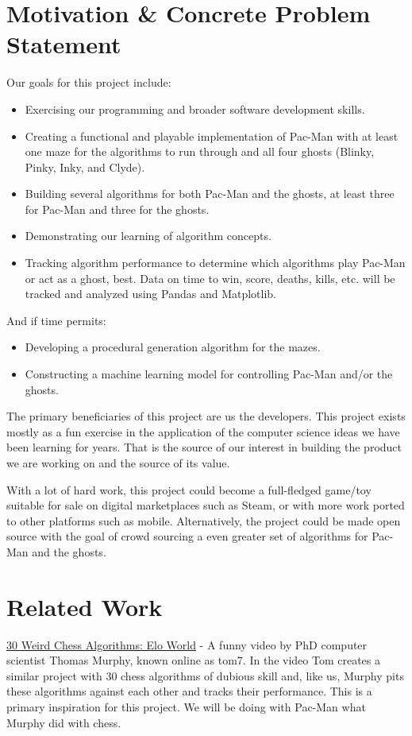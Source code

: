 \documentclass[12pt]{article}
\begin{document}
    \section{Motivation \& Concrete Problem Statement}
        Our goals for this project include:
        \begin{itemize}
            \itemsep-4pt
            \item Exercising our programming and broader software development skills.
            \item Creating a functional and playable implementation of Pac-Man with at least one maze for the algorithms to run through and all four ghosts (Blinky, Pinky, Inky, and Clyde).
            \item Building several algorithms for both Pac-Man and the ghosts, at least three for Pac-Man and three for the ghosts.
            \item Demonstrating our learning of algorithm concepts.
            \item Tracking algorithm performance to determine which algorithms play Pac-Man or act as a ghost, best. Data on time to win, score, deaths, kills, etc. will be tracked and analyzed using Pandas and Matplotlib.
        \end{itemize}
        And if time permits:
        \begin{itemize}
            \itemsep-4pt
            \item Developing a procedural generation algorithm for the mazes.
            \item Constructing a machine learning model for controlling Pac-Man and/or the ghosts.
        \end{itemize}
        The primary beneficiaries of this project are us the developers. This project exists mostly as a fun exercise in the application of the computer science ideas we have been learning for years. That is the source of our interest in building the product we are working on and the source of its value.
        
        With a lot of hard work, this project could become a full-fledged game/toy suitable for sale on digital marketplaces such as Steam, or with more work ported to other platforms such as mobile. Alternatively, the project could be made open source with the goal of crowd sourcing a even greater set of algorithms for Pac-Man and the ghosts.
    \section{Related Work}
        \href{https://www.youtube.com/watch?v=DpXy041BIlA&t=12s}{30 Weird Chess Algorithms: Elo World} - A funny video by PhD computer scientist Thomas Murphy, known online as tom7. In the video Tom creates a similar project with 30 chess algorithms of dubious skill and, like us, Murphy pits these algorithms against each other and tracks their performance. This is a primary inspiration for this project. We will be doing with Pac-Man what Murphy did with chess\cite{30ChessAlgs}.
\end{document}
